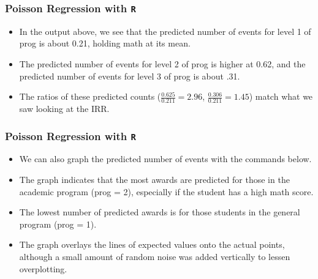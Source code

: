 \documentclass[00-GLMregslides.tex]{subfiles}
\begin{document}
\begin{frame}[fragile]

\frametitle{Poisson Regression with \texttt{R}}
\Large 
\begin{itemize}
\item 
In the output above, we see that the predicted number of events for level 1 of prog is about 0.21, holding math at its mean.
\item The predicted number of events for level 2 of prog is higher at 0.62, and the predicted number of events for level 
3 of prog is about .31. 
\item The ratios of these predicted counts (\(\frac{0.625}{0.211} = 2.96\), \(\frac{0.306}{0.211} = 1.45\)) match what 
we saw looking at the IRR.
\end{itemize}
\end{frame}

\begin{frame}[fragile]
\frametitle{Poisson Regression with \texttt{R}}
\Large

\begin{itemize}
\item We can also graph the predicted number of events with the commands below. 
\item The graph indicates that the most awards are predicted for those in the academic program (prog = 2), 
especially if the student has a high math score. 
\item The lowest number of predicted awards is for those students in the general program (prog = 1). 
\item The graph overlays the lines of expected values onto the actual points, although a small amount of random noise was added vertically to lessen overplotting.
\end{itemize}
\end{frame}
\end{document}

